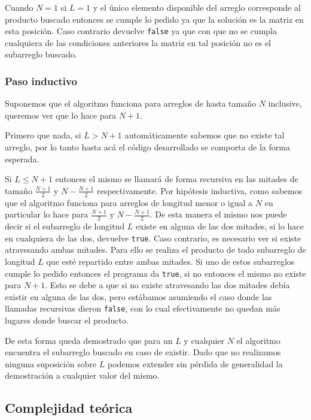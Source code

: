 Cuando $N = 1$ si $L = 1$ y el único elemento disponible del arreglo corresponde
al producto buscado entonces se cumple lo pedido ya que la solución es la matriz
en esta posición. Caso contrario devuelve \texttt{false} ya que con que no se
cumpla cualquiera de las condiciones anteriores la matriz en tal posición no es
el subarreglo buscado.

\subsubsection*{Paso inductivo}

Suponemos que el algoritmo funciona para arreglos de hasta tamaño $N$ inclusive,
queremos ver que lo hace para $N + 1$.

Primero que nada, si $L > N + 1$ automáticamente sabemos que no existe tal
arreglo, por lo tanto hasta acá el código desarrollado se comporta de la forma
esperada.

Si $L \leq N + 1$ entonces el mismo se llamará de forma recursiva en las mitades
de tamaño $\frac{N + 1}{2}$ y $N - \frac{N + 1}{2}$ respectivamente. Por
hipótesis inductiva, como sabemos que el algoritmo funciona para arreglos de
longitud menor o igual a $N$ en particular lo hace para $\frac{N + 1}{2}$ y $N -
\frac{N + 1}{2}$. De esta manera el mismo nos puede decir si el subarreglo de
longitud $L$ existe en alguna de las dos mitades, si lo hace en cualquiera de
las dos, devuelve \texttt{true}. Caso contrario, es necesario ver si existe
atravesando ambas mitades. Para ello se realiza el producto de todo subarreglo
de longitud $L$ que esté repartido entre ambas mitades. Si uno de estos
subarreglos cumple lo pedido entonces el programa da \texttt{true}, si no
entonces el mismo no existe para $N + 1$. Esto se debe a que si no existe
atravesando las dos mitades debía existir en alguna de las dos, pero estábamos
asumiendo el caso donde las llamadas recursivas dieron \texttt{false}, con lo
cual efectivamente no quedan más lugares donde buscar el producto.

De esta forma queda demostrado que para un $L$ y cualquier $N$ el algoritmo
encuentra el subarreglo buscado en caso de existir. Dado que no realizamos
ninguna suposición sobre $L$ podemos extender sin pérdida de generalidad la
demostración a cualquier valor del mismo.

\subsection{Complejidad teórica}

